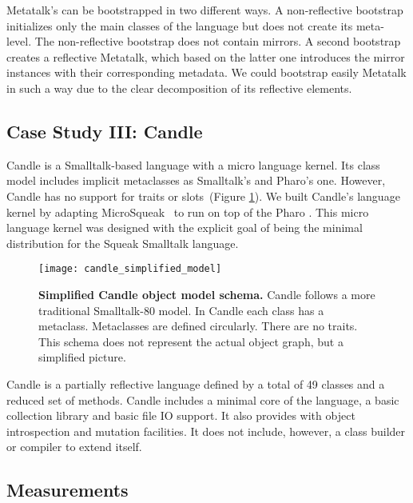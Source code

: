 Metatalk's can be bootstrapped in two different ways. A non-reflective bootstrap initializes only the main classes of the language but does not create its meta-level. The non-reflective bootstrap does not contain mirrors. A second bootstrap creates a reflective Metatalk, which based on the latter one introduces the mirror instances with their corresponding metadata. We could bootstrap easily Metatalk in such a way due to the clear decomposition of its reflective elements. 

\subsection{Case Study III: Candle} \label{sec:bootstrap_candle}

Candle is a Smalltalk-based language with a micro language kernel. Its class model includes implicit metaclasses as Smalltalk's and Pharo's one. However, Candle has no support for traits or slots~(Figure \ref{fig:candle_simplified_model}). We built Candle's language kernel by adapting MicroSqueak~\cite{Malo11a} to run on top of the Pharo \VM. This micro language kernel was designed with the explicit goal of being the minimal distribution for the Squeak Smalltalk language.

\begin{figure}[ht]
\center
\texttt{[image: candle\_simplified\_model]}
\caption{\textbf{Simplified Candle object model schema.} Candle follows a more traditional Smalltalk-80 model. In Candle each class has a metaclass. Metaclasses are defined circularly. There are no traits. This schema does not represent the actual object graph, but a simplified picture.\label{fig:candle_simplified_model}}
\end{figure}


Candle is a partially reflective language defined by a total of 49 classes and a reduced set of methods. Candle includes a minimal core of the language, a basic collection library and basic file IO support. It also provides with object introspection and mutation facilities. It does not include, however, a class builder or compiler to extend itself.%

\subsection{Measurements}

